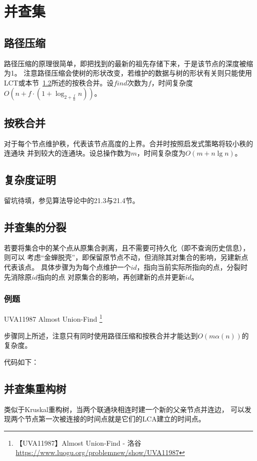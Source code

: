 \section{并查集}\label{DSU}
\subsection{路径压缩}
路径压缩的原理很简单，即把找到的最新的祖先存储下来，于是该节点的深度被缩为1。
注意路径压缩会使树的形状改变，若维护的数据与树的形状有关则只能使用
LCT或本节~\ref{RankMerge}所述的按秩合并。设$find$次数为$f$，时间复杂度
$O(n+f\cdot (1+\log_{2+\frac{f}{n}}n))$。
\subsection{按秩合并}\label{RankMerge}
对于每个节点维护秩，代表该节点高度的上界。合并时按照启发式策略将较小秩的连通块
并到较大的连通块。设总操作数为$m$，时间复杂度为$O(m+n\lg n)$。
\subsection{复杂度证明}
留坑待填，参见算法导论\cite{ITA3}中的21.3与21.4节。
\subsection{并查集的分裂}
若要将集合中的某个点从原集合剥离，且不需要可持久化（即不查询历史信息），则可以
考虑``金蝉脱壳''，即保留原节点不动，但消除其对集合的影响，另建新点代表该点。
具体步骤为为每个点维护一个$id$，指向当前实际所指向的点，分裂时先消除原$id$指向的点
对原集合的影响，再创建新的点并更新$id$。

\subsubsection{例题}

UVA11987 Almost Union-Find \footnote{
    【UVA11987】Almost Union-Find - 洛谷
    \url{https://www.luogu.org/problemnew/show/UVA11987}}

步骤同上所述，注意只有同时使用路径压缩和按秩合并才能达到$O(m\alpha(n))$的复杂度。

代码如下：


\subsection{并查集重构树}
类似于Kruskal重构树，当两个联通块相连时建一个新的父亲节点并连边，
可以发现两个节点第一次被连接的时间点就是它们的LCA建立的时间点。

